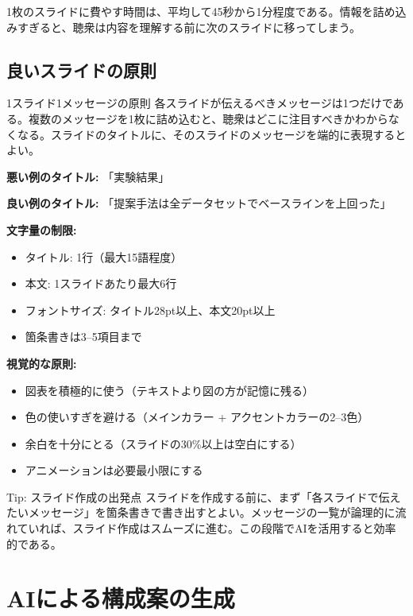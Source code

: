 1枚のスライドに費やす時間は、平均して45秒から1分程度である。情報を詰め込みすぎると、聴衆は内容を理解する前に次のスライドに移ってしまう。

\subsection{良いスライドの原則}

\begin{itembox}[l]{1スライド1メッセージの原則}
各スライドが伝えるべきメッセージは1つだけである。複数のメッセージを1枚に詰め込むと、聴衆はどこに注目すべきかわからなくなる。スライドのタイトルに、そのスライドのメッセージを端的に表現するとよい。

\textbf{悪い例のタイトル:} 「実験結果」

\textbf{良い例のタイトル:} 「提案手法は全データセットでベースラインを上回った」
\end{itembox}

\textbf{文字量の制限:}

\begin{itemize}
\item タイトル: 1行（最大15語程度）
\item 本文: 1スライドあたり最大6行
\item フォントサイズ: タイトル28pt以上、本文20pt以上
\item 箇条書きは3--5項目まで
\end{itemize}

\textbf{視覚的な原則:}

\begin{itemize}
\item 図表を積極的に使う（テキストより図の方が記憶に残る）
\item 色の使いすぎを避ける（メインカラー + アクセントカラーの2--3色）
\item 余白を十分にとる（スライドの30\%以上は空白にする）
\item アニメーションは必要最小限にする
\end{itemize}

\begin{itembox}[l]{Tip: スライド作成の出発点}
スライドを作成する前に、まず「各スライドで伝えたいメッセージ」を箇条書きで書き出すとよい。メッセージの一覧が論理的に流れていれば、スライド作成はスムーズに進む。この段階でAIを活用すると効率的である。
\end{itembox}

\section{AIによる構成案の生成}
\label{sec:5.2}

